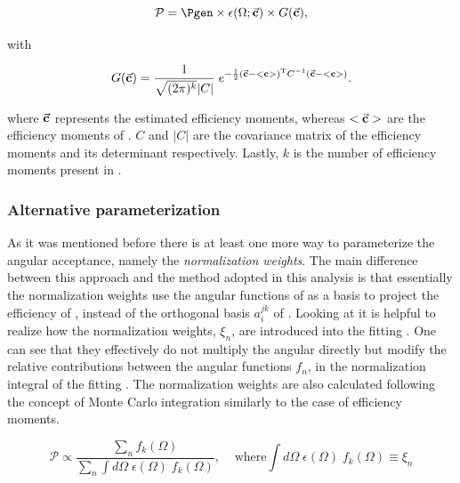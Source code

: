 \begin{equation}
  \centering
  \mathcal{P}= \Pgen \times\epsilon(\Omega;\vec{\bf c})  \times G(\vec{\bf{c}}),
  \label{mvm_constr}
\end{equation}

\noindent with

\begin{equation}
\centering
  G(\vec{\bf{c}}) = \frac{1}{\sqrt{(2\pi)^k}|C|} \; e^{-\frac{1}{2}(  \vec{\bf{c}} - <{\bf{c}}>  )^{\text{T}} C^{-1} (\vec{\bf{c}} - <{\bf{c}}> ) }.
\label{mvm_constr_gauss}
\end{equation}

\noindent where $\vec{\bf c}$ represents the estimated efficiency moments, whereas $<\vec{\bf c}>$ are the efficiency moments
of . $C$ and $|C|$ are the covariance matrix of the efficiency moments and its determinant respectively.
Lastly, $k$ is the number of efficiency moments present in .

\subsubsection{Alternative parameterization}
As it was mentioned before there is at least one more way to parameterize the angular acceptance, namely the \emph{normalization weights}.
The main difference between this approach and the method adopted in this analysis is that essentially the normalization weights use the angular functions
of  as a basis to project the efficiency of , instead of the orthogonal basis $a_i^{jk}$ of .
Looking at  it is helpful to realize how the normalization weights, $\xi_n$, are introduced into the fitting \pdf.
One can see that they effectively do not multiply the angular \pdf directly but modify the relative contributions between the angular functions
$f_n$, in the normalization integral of the fitting \pdf. The normalization weights are also calculated following the concept of Monte Carlo integration
similarly to the case of efficiency moments.

\begin{equation}
  \mathcal{P} \propto \frac{\sum_n f_k(\Omega)}{\sum_n \int d\Omega \; \epsilon(\Omega) \; f_k(\Omega)}, \;\;\;\;\text{where} \int d\Omega \; \epsilon(\Omega) \; f_k(\Omega) \equiv \xi_n
  \label{norm_weights_pdf}
\end{equation}

